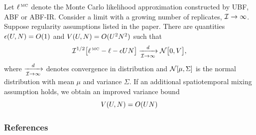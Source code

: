 \documentclass{beamer}
\begin{document}
\begin{frame}
\begin{theorem}  \label{thm:tif}
Let $\ell^{\,\mbox{\tiny MC}}$ denote the Monte Carlo likelihood approximation constructed by UBF, ABF or ABF-IR.
Consider a limit with a growing number of replicates, $\mathcal{I}\to\infty$.
Suppose regularity assumptions listed in the paper.
There are quantities $\epsilon(U,N) = O(1)$ and $V(U,N)=O(U^2N^2)$ such that
\begin{equation}
\nonumber
\mathcal{I}^{1/2}\big[ \ell^{\,\mbox{\tiny MC}}-\ell-\epsilon UN \big]  \xrightarrow[\mathcal{I} \rightarrow \infty]{d} \mathcal{N}\big[0,V\big],
\end{equation}
where $\xrightarrow[\mathcal{I} \rightarrow \infty]{d}$ denotes convergence in distribution and $\mathcal{N}[\mu,\Sigma]$ is the normal distribution with mean $\mu$ and variance $\Sigma$.
If an additional spatiotemporal mixing assumption holds, we obtain an improved variance bound
\begin{equation}
\nonumber
V(U,N) = O(UN)
\end{equation}
\end{theorem}
\end{frame}




\begin{frame}[allowframebreaks]
\frametitle{References}


\end{frame}
\end{document}
